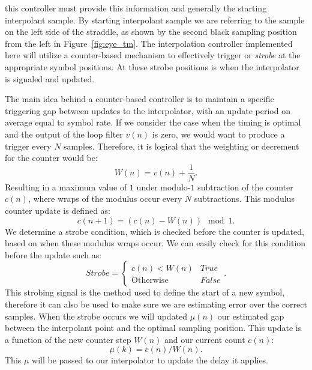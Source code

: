 \documentclass[letterpaper,12pt]{article}
\begin{document}
this controller must provide this information and generally the starting interpolant sample.  By starting 
interpolant sample we are referring to the sample on the left side of the straddle, as shown by the second 
black sampling position from the left in Figure~\ref{fig:eye_tm}.  The interpolation controller implemented here 
will utilize a counter-based mechanism to effectively trigger or \textit{strobe} at the appropriate symbol 
positions. At these strobe positions is when the interpolator is signaled and updated.\par
%
The main idea behind a counter-based controller is to maintain a specific triggering gap between updates to the interpolator, with an update period on average equal to symbol rate.  If we consider the case when the timing is optimal and the output of the loop filter $v(n)$ is zero, we would want to produce a trigger every $N$ samples.  Therefore, it is logical that the weighting or decrement for the counter would be:
%
\begin{equation}
 W(n) = v(n) + \frac{1}{N}.
\end{equation}
%
Resulting in a maximum value of $1$ under modulo-$1$ subtraction of the counter $c(n)$, where wraps of the modulus occur every $N$ subtractions.  This modulus counter update is defined as:
%
\begin{equation}
 c(n+1) = (c(n) -W(n))\mod{1}.
\end{equation}
%
We determine a strobe condition, which is checked before the counter is updated, based on when these modulus wraps occur.  We can easily check for this condition before the update such as:
%
\begin{equation}
 Strobe = \begin{cases}
 c(n) < W(n) & True \\ 
\mbox{Otherwise} & False \end{cases}.
\end{equation}
%
This strobing signal is the method used to define the start of a new symbol, therefore it can also be used to make sure we are estimating error over the correct samples.  When the strobe occurs we will updated $\mu(n)$ our estimated gap between the interpolant point and the optimal sampling position.  This update is a function of the new counter step $W(n)$ and our current count $c(n)$:
%
\begin{equation}
	\mu(k) = c(n)/W(n).
\end{equation}
%
This $\mu$ will be passed to our interpolator to update the delay it applies.\par
\end{document}
